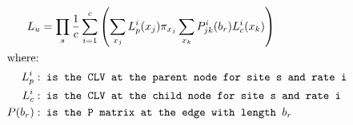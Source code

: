 \documentclass{standalone}
\begin{document}
\begin{minipage}{2in}
\begin{align*}
  L_u &= \prod\limits_{s}^{}\frac{1}{c}\sum\limits_{i=1}^{c}\left(\sum\limits_{x_j}^{}L_p^i(x_j)\pi_{x_j}\sum\limits_{x_k}^{}P^i_{jk}(b_r)L_c^i(x_k)\right) \\
\intertext{where:}
L_p^i: & \texttt{ is the CLV at the parent node for site s and rate i} \\
L_c^i: & \texttt{ is the CLV at the child node for site s and rate i} \\
P(b_r): & \texttt{ is the P matrix at the edge with length $b_r$}
\end{align*}
\end{minipage}
\end{document}
